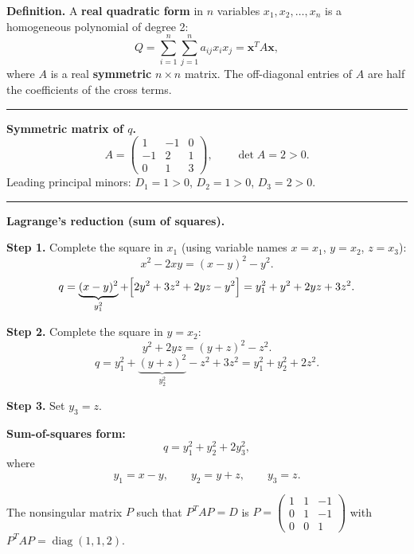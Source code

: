 \documentclass[12pt,a3paper]{article}
\begin{document}
\begin{tcolorbox}[enhanced,breakable,
  colback=cE!4,colframe=cE,boxrule=0.8pt,arc=5pt,
  title={\textbf{Answer --- Quadratic Form Definition \& Sum-of-Squares Reduction:
    $q = x^2+2y^2+3z^2-2xy+2yz$}},
  fonttitle=\bfseries\color{white},colbacktitle=cE]

\textbf{Definition.}
A \textbf{real quadratic form} in $n$ variables $x_1,x_2,\ldots,x_n$ is a
homogeneous polynomial of degree 2:
\[
  Q = \sum_{i=1}^n\sum_{j=1}^n a_{ij}x_i x_j = \mathbf{x}^T A \mathbf{x},
\]
where $A$ is a real \textbf{symmetric} $n\times n$ matrix.
The off-diagonal entries of $A$ are half the coefficients of the cross terms.

\medskip\textcolor{cE}{\rule{\textwidth}{0.4pt}}

\textbf{Symmetric matrix of $q$.}
\[
  A = \begin{pmatrix}1&-1&0\\-1&2&1\\0&1&3\end{pmatrix}, \qquad \det A = 2 > 0.
\]
Leading principal minors: $D_1 = 1 > 0$, $D_2 = 1 > 0$, $D_3 = 2 > 0$.

\medskip\textcolor{cE}{\rule{\textwidth}{0.4pt}}

\textbf{Lagrange's reduction (sum of squares).}

\textbf{Step 1.} Complete the square in $x_1$ (using variable names $x=x_1$, $y=x_2$, $z=x_3$):
\[
  x^2 - 2xy = (x-y)^2 - y^2.
\]
\[
  q = \underbrace{(x-y)^2}_{y_1^2} + \Bigl[2y^2+3z^2+2yz - y^2\Bigr]
  = y_1^2 + y^2 + 2yz + 3z^2.
\]

\textbf{Step 2.} Complete the square in $y=x_2$:
\[
  y^2 + 2yz = (y+z)^2 - z^2.
\]
\[
  q = y_1^2 + \underbrace{(y+z)^2}_{y_2^2} - z^2 + 3z^2
  = y_1^2 + y_2^2 + 2z^2.
\]

\textbf{Step 3.} Set $y_3 = z$.

\medskip
\textbf{Sum-of-squares form:}
\[
  \boxed{q = y_1^2 + y_2^2 + 2y_3^2,}
\]
where
\[
  y_1 = x - y, \qquad y_2 = y + z, \qquad y_3 = z.
\]

The nonsingular matrix $P$ such that $P^T A P = D$ is
$P = \begin{pmatrix}1&1&-1\\0&1&-1\\0&0&1\end{pmatrix}$
with $P^TAP = \operatorname{diag}(1,1,2)$.


\end{tcolorbox}
\end{document}
